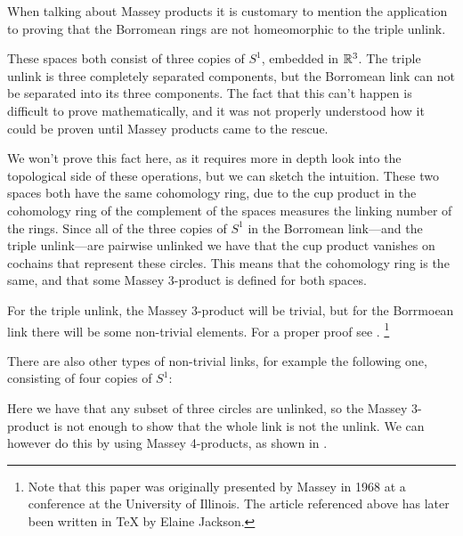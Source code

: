 \begin{example}
When talking about Massey products it is customary to mention the application to proving that the Borromean rings are not homeomorphic to the triple unlink. 

\begin{center}
\def\svgwidth{0.8\textwidth}

\end{center}

These spaces both consist of three copies of $S^1$, embedded in $\mathbb{R}^3$. The triple unlink is three completely separated components, but the Borromean link can not be separated into its three components. The fact that this can't happen is difficult to prove mathematically, and it was not properly understood how it could be proven until Massey products came to the rescue. 

We won't prove this fact here, as it requires more in depth look into the topological side of these operations, but we can sketch the intuition. These two spaces both have the same cohomology ring, due to the cup product in the cohomology ring of the complement of the spaces measures the linking number of the rings. Since all of the three copies of $S^1$ in the Borromean link---and the triple unlink---are pairwise unlinked we have that the cup product vanishes on cochains that represent these circles. This means that the cohomology ring is the same, and that some Massey $3$-product is defined for both spaces. 

For the triple unlink, the Massey 3-product will be trivial, but for the Borrmoean link there will be some non-trivial elements. For a proper proof see \cite{linking}. \footnote{Note that this paper was originally presented by Massey in 1968 at a conference at the University of Illinois. The article referenced above has later been written in \TeX{} by Elaine Jackson.}
\end{example}

\begin{example}
There are also other types of non-trivial links, for example the following one, consisting of four copies of $S^1$:

\begin{center}
\def\svgwidth{0.7\textwidth}

\end{center}

Here we have that any subset of three circles are unlinked, so the Massey 3-product is not enough to show that the whole link is not the unlink. We can however do this by using Massey 4-products, as shown in \cite{four-link}. 
\end{example}



